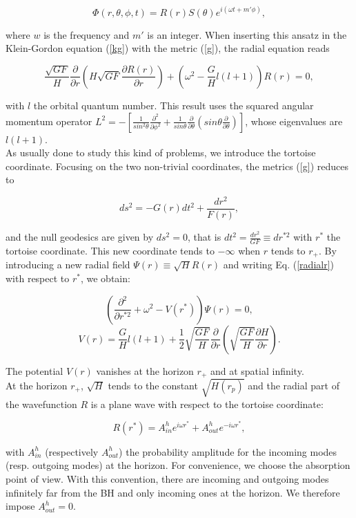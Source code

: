 \documentclass[twocolumn,amsmath,amssymb,prl,10pt,nofootinbib,superscriptaddress]{revtex4}
\def\be{\begin{equation}}
\def\ee{\end{equation}}
\begin{document}
\be
\Phi(r, \theta, \phi ,t)=R(r)S(\theta)e^{i(\omega t+m' \phi)},
\ee

\noindent where $w$ is the frequency and $m'$ is an integer. When inserting this ansatz in the Klein-Gordon equation (\ref{kg}) with the metric (\ref{g}), the radial equation reads

\be
\frac{\sqrt{GF}}{H} \frac{\partial }{\partial  r} \left( H\sqrt{GF}\frac{\partial  R(r)}{\partial  r}\right)+\left(\omega ^2 - \frac{G}{H} l(l+1) \right) R(r)=0,
\label{radialr}
\ee

\noindent with $l$ the orbital quantum number. This result uses the squared angular momentum operator $L^2=- \left[ \frac{1}{sin^2 \theta } \frac{\partial ^2}{\partial \phi ^2} +  \frac{1}{sin \theta } \frac{\partial }{\partial \theta } \left( sin \theta \frac{\partial }{\partial \theta} \right) \right] $,  whose eigenvalues are $l(l+1)$. \\


As usually done to study this kind of problems, we introduce the tortoise coordinate. Focusing on the two non-trivial coordinates, the metrics (\ref{g}) reduces to

\be
ds^2  =  -G(r)dt^2+\frac{dr^2}{F(r)},
\ee

\noindent and the null geodesics are given by $ds^2=0$, that is $dt^2=\frac{dr^2}{GF} \equiv dr^{* 2}$ with $r^*$ the tortoise coordinate. This new coordinate tends to $- \infty$ when $r$ tends to $r_+$. By introducing a new radial field $\Psi (r) \equiv \sqrt{H} R(r)$ and writing Eq. (\ref{radialr}) with respect to $r^*$, we obtain:

\be
\left( \frac{\partial ^2 }{\partial  r^{* 2}} +\omega ^2 - V(r^*) \right) \Psi (r) = 0,
\ee
\be
V(r) = \frac{G}{H} l(l+1)+\frac{1}{2}\sqrt{\frac{GF}{H}}\frac{\partial}{\partial r}\left(\sqrt{\frac{GF}{H}}\frac{\partial H}{\partial r} \right).
\ee


\noindent The potential $V(r)$ vanishes at the horizon $r_+$ and at spatial infinity. \\

At the horizon $r_+$, $\sqrt{H}$ tends to the constant $\sqrt{H(r_p)}$ and the radial part of the wavefunction $R$ is a plane wave with respect to the tortoise coordinate: 

\be
R (r^*)= A^h_{in}e^{i \omega r^*}+A^h_{out}e^{-i \omega r^*},
\label{horizon}
\ee

\noindent with $A^h_{in}$ (respectively $A^h_{out}$) the probability amplitude for the incoming modes (resp. outgoing modes) at the horizon. For convenience, we choose the absorption point of view. With this convention, there are incoming and outgoing modes infinitely far from the BH and only incoming ones at the horizon. We therefore impose $A^h_{out}=0$. \\
\end{document}
